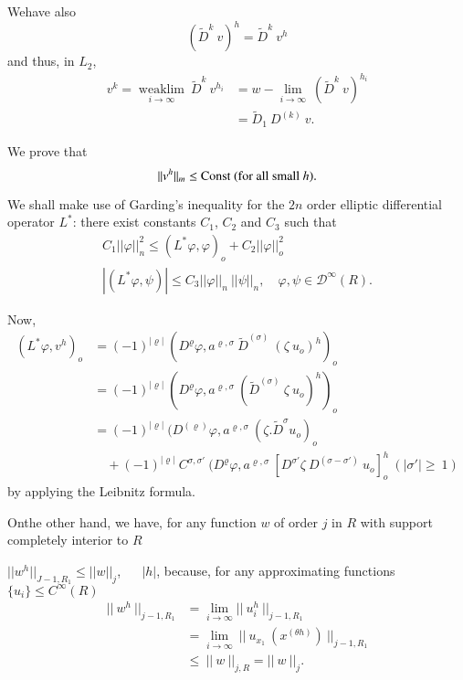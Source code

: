 We\pageoriginale have also 
$$
(\tilde{D}^k ~ v)^h = \tilde{D}^k ~ v^h
$$
and thus, in $L_2$,
\begin{align*}
 v^k = \underset{i \rightarrow \infty}{\text{weak}\lim} ~\tilde{D}^k
 ~ v^{h_i} & = 
 w-\lim_{i \rightarrow \infty} ~ (\tilde{D}^k ~ v)^{h_i}\\ 
 & = \tilde{D}_1 ~D^{(k)} ~ v.
\end{align*}

We prove that 
$$
|| v^h ||_m \le \operatorname{Const} ~(\text{for all small} ~h).
$$

We shall make use of Garding's inequality for the $2n$ order elliptic
differential operator $L^*$: there exist constants $C_1$, $C_2$ and $C_3$
such that 
\begin{gather*}
 C_1 || \varphi ||^2_n \le (L^* \varphi, \varphi)_o + C_2 || \varphi
 ||^2_o\\ 
 | (L^* \varphi, \psi) | \le C_3 || \varphi ||_n ~ || \psi ||_n,
 \quad \varphi, \psi \in \mathscr{D}^\infty(R). 
\end{gather*}

Now,
\begin{align*}
 (L^* \varphi, v^h)_o & = (-1)^{|\varrho|} ~ (D^\varrho \varphi,
 a^{\varrho,\sigma} ~ \tilde{D}^{(\sigma )} ~ (\zeta ~ u_o)^h)_o\\ 
 & = (-1)^{|\varrho |} ~ (D^\varrho \varphi, a^{\varrho,\sigma} ~
 (\tilde{D}^{(\sigma)} ~ \zeta ~ u_o)^h)_o\\ 
 & = (-1)^{|\varrho|} ~ (D^{(\varrho)} \varphi, a^{\varrho,\sigma} ~
 (\zeta.\tilde{D}^{\sigma} u_o)_o\tag{*}\\ 
 & \quad + (-1)^{|\varrho|} ~ C^{\sigma,\sigma'} ~ (D^\varrho \varphi,
 a^{\varrho,\sigma} ~ \left[D^{\sigma'} \zeta ~ D^{(\sigma - \sigma')}
  ~ u_o\right]^h_o ~ (|\sigma' |\ge ~1) 
\end{align*}
by applying the Leibnitz formula.

On\pageoriginale the other hand, we have, for any function $w$ of order $j$ in $R$
with support completely interior to $R$ 

$|| w^h ||_{J-1,R_1} \le || w ||_j$, ~~ $| h |$,
because, for any approximating functions $\{ u_i \} \le C^\infty (R)$
\begin{align*}
 || ~ w^h ~ ||_{j- 1,R_1} & = \lim_{i\rightarrow \infty} || ~ u^h_i ~
 ||_{j - 1, R_1}\\ 
 & = \lim_{i \rightarrow \infty} ~ || ~ u_{x_1} ~ (x^{(\theta h)}) ~
 ||_{j-1,R_1}\\ 
 & \le ~|| ~ w ~ ||_{j,R} = || ~ w ~ ||_j.
\end{align*}

